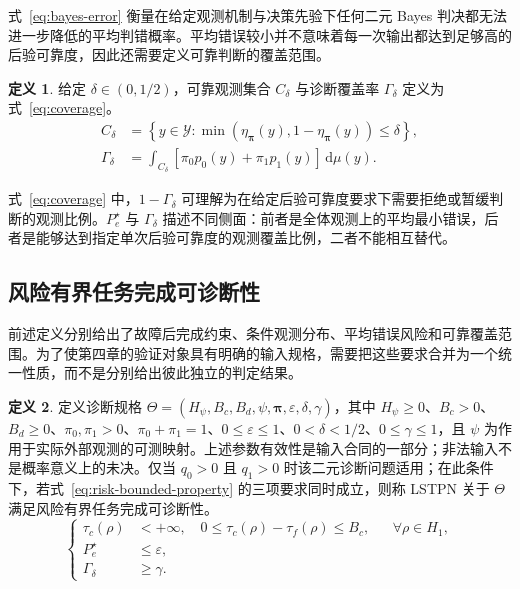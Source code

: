 \documentclass[master,fontset=ubuntu]{shnuthesis}
\theoremstyle{definition}
\newtheorem{thesisdefinition}{定义}
\begin{document}
式~\eqref{eq:bayes-error} 衡量在给定观测机制与决策先验下任何二元 Bayes 判决都无法进一步降低的平均判错概率。平均错误较小并不意味着每一次输出都达到足够高的后验可靠度，因此还需要定义可靠判断的覆盖范围。

\begin{thesisdefinition}
\label{def:diagnostic-coverage}
给定 \(\delta\in(0,1/2)\)，可靠观测集合 \(C_\delta\) 与诊断覆盖率 \(\Gamma_\delta\) 定义为式~\eqref{eq:coverage}。
\begin{equation}
\begin{aligned}
C_\delta
&=
\left\{
y\in\mathcal Y:
\min\!\left(
\eta_{\boldsymbol\pi}(y),
1-\eta_{\boldsymbol\pi}(y)
\right)
\leq\delta
\right\},\\
\Gamma_\delta
&=
\int_{C_\delta}
\left[
\pi_0p_0(y)+\pi_1p_1(y)
\right]
\,\mathrm d\mu(y).
\end{aligned}
\label{eq:coverage}
\end{equation}
\end{thesisdefinition}

式~\eqref{eq:coverage} 中，\(1-\Gamma_\delta\) 可理解为在给定后验可靠度要求下需要拒绝或暂缓判断的观测比例。\(P_e^\star\) 与 \(\Gamma_\delta\) 描述不同侧面：前者是全体观测上的平均最小错误，后者是能够达到指定单次后验可靠度的观测覆盖比例，二者不能相互替代。

\subsection{风险有界任务完成可诊断性}

前述定义分别给出了故障后完成约束、条件观测分布、平均错误风险和可靠覆盖范围。为了使第四章的验证对象具有明确的输入规格，需要把这些要求合并为一个统一性质，而不是分别给出彼此独立的判定结果。

\begin{thesisdefinition}
\label{def:risk-bounded-diagnosability}
定义诊断规格 \(\Theta=(H_\psi,B_c,B_d,\psi,\boldsymbol\pi,\varepsilon,\delta,\gamma)\)，其中 \(H_\psi\geq0\)、\(B_c>0\)、\(B_d\geq0\)、\(\pi_0,\pi_1>0\)、\(\pi_0+\pi_1=1\)、\(0\leq\varepsilon\leq1\)、\(0<\delta<1/2\)、\(0\leq\gamma\leq1\)，且 \(\psi\) 为作用于实际外部观测的可测映射。上述参数有效性是输入合同的一部分；非法输入不是概率意义上的未决。仅当 \(q_0>0\) 且 \(q_1>0\) 时该二元诊断问题适用；在此条件下，若式~\eqref{eq:risk-bounded-property} 的三项要求同时成立，则称 LSTPN 关于 \(\Theta\) 满足风险有界任务完成可诊断性。
\begin{equation}
\left\{
\begin{aligned}
\tau_c(\rho)&<+\infty,\quad
0\leq\tau_c(\rho)-\tau_f(\rho)\leq B_c,
&&\forall\rho\in H_1,\\
P_e^\star&\leq \varepsilon,\\
\Gamma_\delta&\geq\gamma.
\end{aligned}
\right.
\label{eq:risk-bounded-property}
\end{equation}
\end{thesisdefinition}
\end{document}
